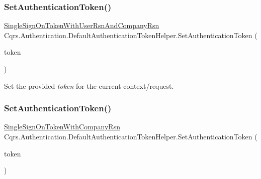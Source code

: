\subsubsection{\texorpdfstring{Set\+Authentication\+Token()}{SetAuthenticationToken()}\hspace{0.1cm}{\footnotesize\ttfamily [1/6]}}
{\footnotesize\ttfamily \hyperlink{classCqrs_1_1Authentication_1_1SingleSignOnTokenWithUserRsnAndCompanyRsn}{Single\+Sign\+On\+Token\+With\+User\+Rsn\+And\+Company\+Rsn} Cqrs.\+Authentication.\+Default\+Authentication\+Token\+Helper.\+Set\+Authentication\+Token (\begin{DoxyParamCaption}\item[{\hyperlink{classCqrs_1_1Authentication_1_1SingleSignOnTokenWithUserRsnAndCompanyRsn}{Single\+Sign\+On\+Token\+With\+User\+Rsn\+And\+Company\+Rsn}}]{token }\end{DoxyParamCaption})}



Set the provided {\itshape token}  for the current context/request. 

\mbox{\label{classCqrs_1_1Authentication_1_1DefaultAuthenticationTokenHelper_a2ae21fb09555d3ab5119f9ea4c69b202_a2ae21fb09555d3ab5119f9ea4c69b202}} 
\subsubsection{\texorpdfstring{Set\+Authentication\+Token()}{SetAuthenticationToken()}\hspace{0.1cm}{\footnotesize\ttfamily [2/6]}}
{\footnotesize\ttfamily \hyperlink{classCqrs_1_1Authentication_1_1SingleSignOnTokenWithCompanyRsn}{Single\+Sign\+On\+Token\+With\+Company\+Rsn} Cqrs.\+Authentication.\+Default\+Authentication\+Token\+Helper.\+Set\+Authentication\+Token (\begin{DoxyParamCaption}\item[{\hyperlink{classCqrs_1_1Authentication_1_1SingleSignOnTokenWithCompanyRsn}{Single\+Sign\+On\+Token\+With\+Company\+Rsn}}]{token }\end{DoxyParamCaption})}



